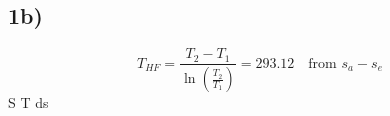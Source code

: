 

\subsection*{1b)}
\[
T_{HF} = \frac{T_2 - T_1}{\ln \left( \frac{T_2}{T_1} \right)} = 293.12 \quad \text{from } s_{a} - s_{e}
\]
 \int S T ds \rightarrow \text{)}